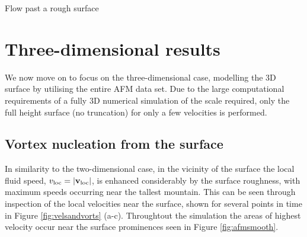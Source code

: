 \begin{chapter}{\label{cha:afm}Flow past a rough surface}
\section{Three-dimensional results}
We now move on to focus on the three-dimensional case, modelling the 3D surface by utilising the entire AFM data set. Due to the large computational requirements of a fully 3D numerical simulation of the scale required, only the full height surface (no truncation) for only a few velocities is performed.

\subsection{Vortex nucleation from the surface}
In similarity to the two-dimensional case, in the vicinity of the surface the local fluid speed, $v_{\rm loc}=|{\bf v_{\rm loc}}|$, is enhanced considerably by the surface roughness, with maximum speeds occurring near the tallest mountain. This can be seen through inspection of the local velocities near the surface, shown for several points in time in Figure \ref{fig:velsandvorts} (a-c). Throughtout the simulation the areas of highest velocity occur near the surface prominences seen in Figure \ref{fig:afmsmooth}.


\end{chapter}
